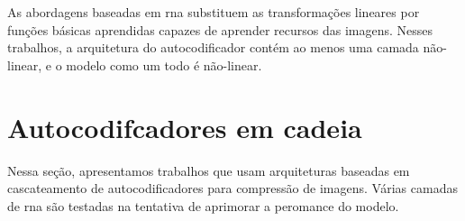 As abordagens baseadas em \acrshort{rna} \cite{Variable2016Toderici,Priming2017Johnston,target,Priming2017Johnston,FullResolution2017Toderici,End2016Balle,Autoregressive2018Minnen,Lossy2017Theis,Variational2018Balle,zhao1901cae} substituem as transformações lineares por funções básicas aprendidas capazes de aprender recursos das imagens. Nesses trabalhos, a arquitetura do autocodificador contém ao menos uma  camada não-linear, e o modelo como um todo é não-linear.   

















\section{Autocodifcadores em cadeia}
Nessa seção, apresentamos trabalhos que usam arquiteturas baseadas em cascateamento de autocodificadores para compressão de imagens. Várias camadas de \acrshort{rna} são testadas na tentativa de aprimorar a peromance do modelo.   


